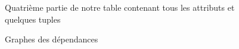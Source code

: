 \documentclass[a4paper,sffamily,12pt]{article}
\begin{document}
				\begin{figure}[!h]
					\centering						
					\caption{Quatrième partie de notre table contenant tous les attributs et quelques tuples}
					\label{table_p4}	
				\end{figure}
				
				\begin{figure}[!h]
					\centering						
					\caption{Graphes des dépendances}
					\label{graphe_dependances}	
				\end{figure}	
					
\end{document}
